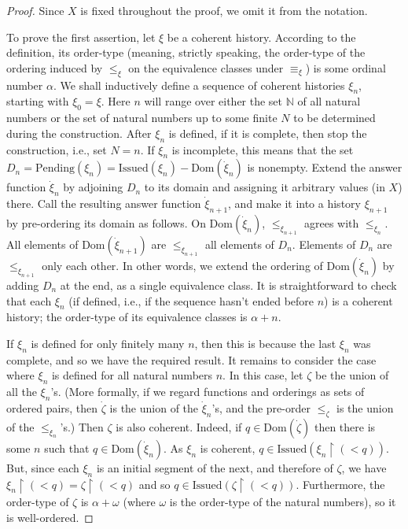 \documentclass{LMCS}
\theoremstyle{definition}
\newcommand{\ans}{\dot}
\newcommand{\bbb}[1]{\ensuremath{\mathbb {#1}}}
\newcommand{\dom}[1]{\ensuremath{{\text{Dom}}(#1)}}
\newcommand{\restr}{\mathop{\upharpoonright}}
\newcommand{\Issued}{\text{Issued}}
\begin{document}
\begin{proof}
Since $X$ is fixed throughout the proof, we omit it from the
notation.

To prove the first assertion, let $\xi$ be a coherent history.
According to the definition, its order-type (meaning, strictly
speaking, the order-type of the ordering induced by $\leq_\xi$ on the
equivalence classes under $\equiv_\xi$) is some ordinal number
$\alpha$.  We shall inductively define a sequence of coherent
histories $\xi_n$, starting with $\xi_0=\xi$.  Here $n$ will range
over either the set \bbb N of all natural numbers or the set of
natural numbers up to some finite $N$ to be determined during the
construction.  After $\xi_n$ is defined, if it is complete, then stop
the construction, i.e., set $N=n$.  If $\xi_n$ is incomplete, this
means that the set
$D_n=\text{Pending}(\xi_n)=\Issued(\xi_n)-\dom{{\ans\xi}_n}$ is
nonempty.  Extend the answer function $\ans\xi_n$ by adjoining $D_n$
to its domain and assigning it arbitrary values (in $X$) there.  Call
the resulting answer function $\ans\xi_{n+1}$, and make it into a
history $\xi_{n+1}$ by pre-ordering its domain as follows. On
$\dom{{\ans\xi}_n}$, $\leq_{\xi_{n+1}}$ agrees with $\leq_{\xi_n}$.  All
elements of $\dom{\ans\xi_{n+1}}$ are $\leq_{\xi_{n+1}}$ all elements of
$D_n$.  Elements of $D_n$ are $\leq_{\xi_{n+1}}$ only each other.  In
other words, we extend the ordering of $\dom{{\ans\xi}_n}$ by adding $D_n$
at the end, as a single equivalence class.  It is straightforward to
check that each $\xi_n$ (if defined, i.e., if the sequence hasn't
ended before $n$) is a coherent history; the order-type of its
equivalence classes is $\alpha+n$.

If $\xi_n$ is defined for only finitely many $n$, then this is because
the last $\xi_n$ was complete, and so we have the required result.  It
remains to consider the case where $\xi_n$ is defined for all natural
numbers $n$.  In this case, let $\zeta$ be the union of all the
$\xi_n$'s.  (More formally, if we regard functions and orderings as
sets of ordered pairs, then $\ans\zeta$ is the union of the
$\ans\xi_n$'s, and the pre-order $\leq_\zeta$ is the union of the
$\leq_{\xi_n}$'s.)  Then $\zeta$ is also coherent.  Indeed, if
$q\in\dom{\ans\zeta}$ then there is some $n$ such that $q\in\dom{{\ans\xi}_n}$.  As
$\xi_n$ is coherent, $q\in\Issued(\xi_n\restr(<q))$.  But,
since each $\xi_n$ is an initial segment of the next, and therefore of
$\zeta$, we have $\xi_n\restr(<q)=\zeta\restr(<q)$ and so
$q\in\Issued(\zeta\restr(<q))$.  Furthermore, the order-type of
$\zeta$ is $\alpha+\omega$ (where $\omega$ is the order-type of the
natural numbers), so it is well-ordered.


\end{proof}
\end{document}
